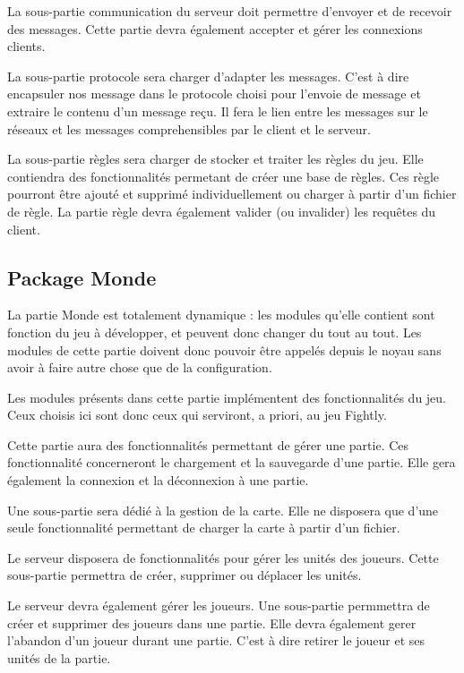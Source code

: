\documentclass[a4paper,10pt]{report}
\begin{document}
	La sous-partie communication du serveur doit permettre d'envoyer et de recevoir des messages. Cette partie devra également accepter et gérer les connexions clients.

	La sous-partie protocole sera charger d'adapter les messages. C'est à dire encapsuler nos message dans le protocole choisi pour l'envoie de message et extraire le contenu d'un message reçu. Il fera le lien entre les messages sur le réseaux et les messages comprehensibles par le client et le serveur.

	La sous-partie règles sera charger de stocker et traiter les règles du jeu. Elle contiendra des fonctionnalités permetant de créer une base de règles. Ces règle pourront être ajouté et supprimé individuellement ou charger à partir d'un fichier de règle. La partie règle devra également valider (ou invalider) les requêtes du client.

      \subsection{Package Monde}

	La partie Monde est totalement dynamique : les modules qu'elle contient sont fonction du jeu à développer, et peuvent donc changer du tout au tout. Les modules de cette partie doivent donc pouvoir être appelés depuis le noyau sans avoir à faire autre chose que de la configuration. 

	Les modules présents dans cette partie implémentent des fonctionnalités du jeu. Ceux choisis ici sont donc ceux qui serviront, a priori, au jeu Fightly.

	Cette partie aura des fonctionnalités permettant de gérer une partie. Ces fonctionnalité concerneront le chargement et la sauvegarde d'une partie. Elle gera également la connexion et la déconnexion à une partie.

	Une sous-partie sera dédié à la gestion de la carte. Elle ne disposera que d'une seule fonctionnalité permettant de charger la carte à partir d'un fichier.

	Le serveur disposera de fonctionnalités pour gérer les unités des joueurs. Cette sous-partie permettra de créer, supprimer ou déplacer les unités.

	Le serveur devra également gérer les joueurs. Une sous-partie permmettra de créer et supprimer des joueurs dans une partie. Elle devra également gerer l'abandon d'un joueur durant une partie. C'est à dire retirer le joueur et ses unités de la partie.
\end{document}

